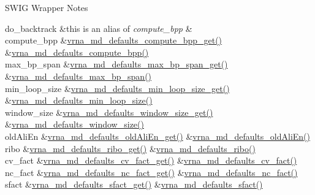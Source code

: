 \begin{DoxyRefDesc}{S\+W\+I\+G Wrapper Notes}
\begin{longtabu}
do\+\_\+backtrack  &this is an alias of {\itshape compute\+\_\+bpp}  &\\
compute\+\_\+bpp  &\mbox{\hyperlink{group__model__details_gaa3a537e61fbe0518673bf9f73fd820f3}{vrna\+\_\+md\+\_\+defaults\+\_\+compute\+\_\+bpp\+\_\+get()}}  &\mbox{\hyperlink{group__model__details_gaf1b5db10f1f476767f9a95f8a78e3132}{vrna\+\_\+md\+\_\+defaults\+\_\+compute\+\_\+bpp()}}   \\
max\+\_\+bp\+\_\+span  &\mbox{\hyperlink{group__model__details_gaa60f989e062fecd4d4bac89c1883da85}{vrna\+\_\+md\+\_\+defaults\+\_\+max\+\_\+bp\+\_\+span\+\_\+get()}}  &\mbox{\hyperlink{group__model__details_ga4c4bc962f09b4480cb8499f1cf8ae4ec}{vrna\+\_\+md\+\_\+defaults\+\_\+max\+\_\+bp\+\_\+span()}}   \\
min\+\_\+loop\+\_\+size  &\mbox{\hyperlink{group__model__details_ga5cc691174a75c652807dc361b617632a}{vrna\+\_\+md\+\_\+defaults\+\_\+min\+\_\+loop\+\_\+size\+\_\+get()}}  &\mbox{\hyperlink{group__model__details_gac152f1e78c1058a10261022c8dfda0f7}{vrna\+\_\+md\+\_\+defaults\+\_\+min\+\_\+loop\+\_\+size()}}   \\
window\+\_\+size  &\mbox{\hyperlink{group__model__details_ga670146a9aa3ba77f4d422d60b7c30ac9}{vrna\+\_\+md\+\_\+defaults\+\_\+window\+\_\+size\+\_\+get()}}  &\mbox{\hyperlink{group__model__details_ga7b802ce0e8c3181bf5cb580de6d5b26a}{vrna\+\_\+md\+\_\+defaults\+\_\+window\+\_\+size()}}   \\
old\+Ali\+En  &\mbox{\hyperlink{group__model__details_ga2374492b5019df88022fe4c05f0f3630}{vrna\+\_\+md\+\_\+defaults\+\_\+old\+Ali\+En\+\_\+get()}}  &\mbox{\hyperlink{group__model__details_ga41521d5b9fb7e0f31e7ea73f5792afab}{vrna\+\_\+md\+\_\+defaults\+\_\+old\+Ali\+En()}}   \\
ribo  &\mbox{\hyperlink{group__model__details_ga169027f0c0561ea7d87b655e4b336bfc}{vrna\+\_\+md\+\_\+defaults\+\_\+ribo\+\_\+get()}}  &\mbox{\hyperlink{group__model__details_ga937c45e1d06fd6168730a9b08d130be3}{vrna\+\_\+md\+\_\+defaults\+\_\+ribo()}}   \\
cv\+\_\+fact  &\mbox{\hyperlink{group__model__details_gae59c68393807217b0a2497adb64d3ee3}{vrna\+\_\+md\+\_\+defaults\+\_\+cv\+\_\+fact\+\_\+get()}}  &\mbox{\hyperlink{group__model__details_gad3a3f40baafd91a6ce80a91a68e20053}{vrna\+\_\+md\+\_\+defaults\+\_\+cv\+\_\+fact()}}   \\
nc\+\_\+fact  &\mbox{\hyperlink{group__model__details_ga7ac759eaa7159bf5f022745f5da59508}{vrna\+\_\+md\+\_\+defaults\+\_\+nc\+\_\+fact\+\_\+get()}}  &\mbox{\hyperlink{group__model__details_gac35e596c850dce3ad55c49119fd7d471}{vrna\+\_\+md\+\_\+defaults\+\_\+nc\+\_\+fact()}}   \\
sfact  &\mbox{\hyperlink{group__model__details_gab2df6aab954b63fd3592d18e90285dae}{vrna\+\_\+md\+\_\+defaults\+\_\+sfact\+\_\+get()}}  &\mbox{\hyperlink{group__model__details_ga3f73d3029d3d0025d4cc311510cd95a3}{vrna\+\_\+md\+\_\+defaults\+\_\+sfact()}}   \\
\end{longtabu}


\end{DoxyRefDesc}


